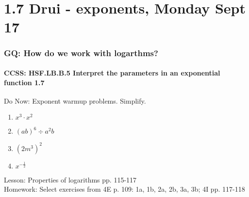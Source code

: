 \documentclass{beamer}
\begin{document}
\section{1.7 Drui - exponents, Monday Sept 17}
  \frame
  {
    \frametitle{GQ: How do we work with logarthms?}
    \framesubtitle{CCSS: HSF.LB.B.5 Interpret the parameters in an exponential function  \alert{1.7}}

    \begin{block}{Do Now: Exponent warmup problems. Simplify.}
      \begin{enumerate}
      \item $x^3 \cdot x^2$
      \item $(ab)^6 \div a^2 b$
      \item $(2m^3)^2$
      \item $\displaystyle x^{-\frac{1}{2}}$
      \end{enumerate}
   \end{block}
    Lesson: Properties of logarithms pp. 115-117\\ \bigskip
    Homework: Select exercises from 4E p. 109: 1a, 1b, 2a, 2b, 3a, 3b; 4I pp. 117-118
  }

  
\end{document}
